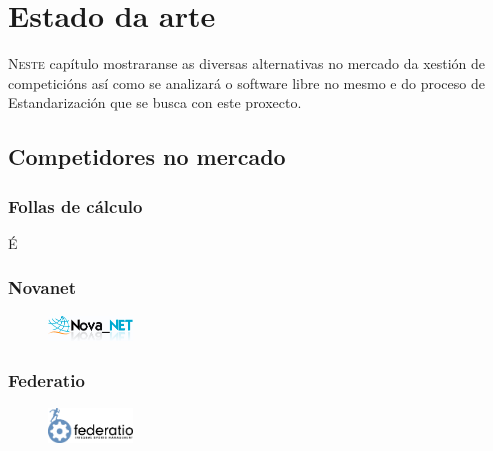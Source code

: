 \chapter{Estado da arte}
\minitoc
\label{chap:Estadodaarte}
\vspace{0.5cm}


  \lettrine{N}{este} capítulo mostraranse as diversas alternativas no mercado da 
xestión de 
competicións así como se analizará o software libre no mesmo e do proceso de 
Estandarización que se busca con este proxecto.

  \section{Competidores no mercado}
    \subsection{Follas de cálculo}
    É 
    \subsection{Novanet}

      \begin{figure}[h!]
	\begin{center}
	  \includegraphics[width=0.2\textwidth]{img/logos/novanet.jpg}
	\end{center}
      \end{figure}

    \subsection{Federatio}

      \begin{figure}[h!]
	    \begin{center}
	      \includegraphics[width=0.2\textwidth]{img/logos/federatio.png}
	    \end{center}
      \end{figure}

